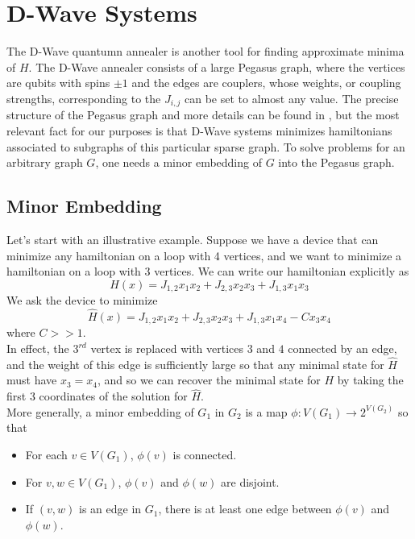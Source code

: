\documentclass[12pt]{article}
\newcommand{\1}{\mathbf{1}}
\theoremstyle{remark}
\theoremstyle{definition}
\theoremstyle{proposition}
\theoremstyle{lemma}
\theoremstyle{definition}
\begin{document}
	\section{D-Wave Systems}
	\indent \indent The D-Wave quantumn annealer is another tool for finding approximate minima of $H$. The D-Wave annealer consists of a large Pegasus graph, where the vertices are qubits with spins $\pm 1$ and the edges are couplers, whose weights, or coupling strengths, corresponding to the $J_{i,  j}$ can be set to almost any value. The precise structure of the Pegasus graph and more details can be found in \cite{dattani2019pegasus}, but the most relevant fact for our purposes is that D-Wave systems minimizes  hamiltonians associated to subgraphs of this particular sparse graph. To solve problems for an arbitrary graph $G$, one needs a minor embedding of $G$ into the Pegasus graph.
	
	\subsection{Minor Embedding}
	\indent \indent Let's start with an illustrative example. Suppose we have a device that can minimize any hamiltonian on a loop with 4 vertices, and we want to minimize a hamiltonian on a loop with 3 vertices. We can write our hamiltonian explicitly as
	$$H(x) = J_{1, 2} x_1x_2 + J_{2, 3} x_2x_3  + J_{1, 3}x_1x_3$$
	We ask the device to minimize
	$$\hat{H}(x) = J_{1, 2} x_1x_2 + J_{2, 3}x_2x_3 + J_{1,3}x_1x_4 - Cx_3x_4$$
	where $C >> 1$. \\
	In effect,  the $3^{rd}$ vertex is replaced with vertices $3$ and $4$ connected by an edge, and the weight of this edge is sufficiently large so that any minimal state for $\hat{H}$ must have $x_3 = x_4$, and so we can recover the minimal state for $H$ by taking the first 3 coordinates of the solution for $\hat{H}$. \\
	\indent More generally, a minor embedding of $G_1$ in $G_2$ is a map $\phi: V(G_1) \rightarrow 2^{V(G_2)}$ so that 
	
	\begin{itemize}
		\item For each $v \in V(G_1)$, $\phi(v)$ is connected.
		\item For $v, w \in V(G_1)$, $\phi(v)$ and $\phi(w)$ are disjoint.
		\item If $(v, w)$ is an edge in $G_1$, there is at least one edge between $\phi(v)$ and $\phi(w)$.
		\end{itemize}
	
\end{document}
